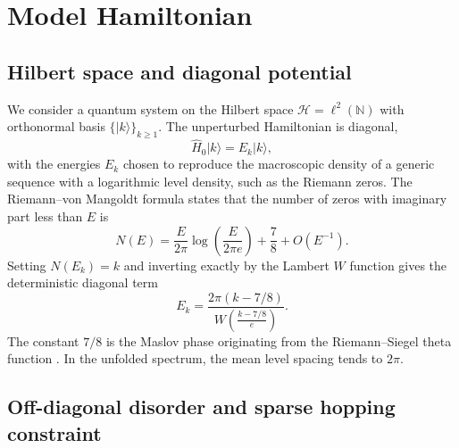 \documentclass[11pt,a4paper]{article}
\newcommand{\N}{\mathbb{N}}
\newcommand{\Hilb}{\mathcal{H}}
\begin{document}
\section{Model Hamiltonian}
\label{sec:model}

\subsection{Hilbert space and diagonal potential}

We consider a quantum system on the Hilbert space $\Hilb = \ell^2(\N)$ with orthonormal basis $\{|k\rangle\}_{k\ge 1}$. The unperturbed Hamiltonian is diagonal,
\begin{equation}
\hat H_0 |k\rangle = E_k |k\rangle,
\end{equation}
with the energies $E_k$ chosen to reproduce the macroscopic density of a generic sequence with a logarithmic level density, such as the Riemann zeros. The Riemann--von Mangoldt formula states that the number of zeros with imaginary part less than $E$ is
\begin{equation}
N(E) = \frac{E}{2\pi}\log\left(\frac{E}{2\pi e}\right) + \frac{7}{8} + O(E^{-1}).
\end{equation}
Setting $N(E_k)=k$ and inverting exactly by the Lambert $W$ function gives the deterministic diagonal term
\begin{equation}
\boxed{ E_k = \frac{2\pi (k - 7/8)}{W\!\left(\frac{k-7/8}{e}\right)} }.
\label{eq:diag}
\end{equation}
The constant $7/8$ is the Maslov phase originating from the Riemann--Siegel theta function \cite{Corless1996}. In the unfolded spectrum, the mean level spacing tends to $2\pi$.

\subsection{Off-diagonal disorder and sparse hopping constraint}
\end{document}
